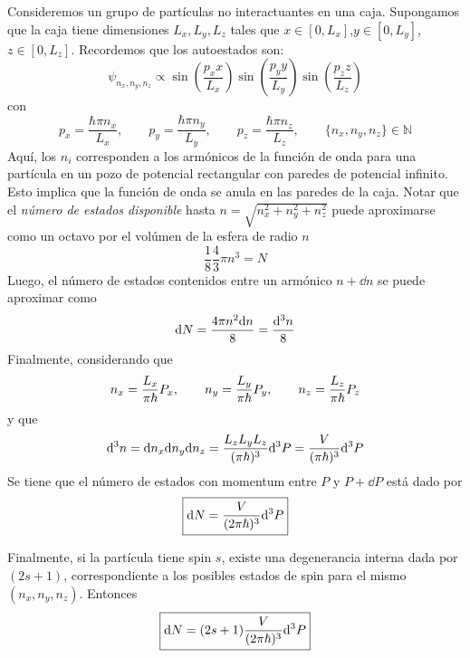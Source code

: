 Consideremos un grupo de partículas no interactuantes en una caja. Supongamos que la caja tiene dimensiones $L_x,L_y,L_z$ tales que $x\in [0,L_x]$,$y\in [0,L_y]$, $z\in [0,L_z]$. Recordemos que los autoestados son:
\begin{equation}
  \psi_{n_x,n_y,n_z}\propto \sin\left(\frac{p_xx}{L_x}\right)\sin\left(\frac{p_yy}{L_y}\right)\sin\left(\frac{p_zz}{L_z}\right)
\end{equation}
con
\begin{equation}
  p_x=\frac{\hbar \pi n_x}{L_x},\qquad p_y=\frac{\hbar \pi n_y}{L_y},\qquad p_z=\frac{\hbar \pi n_z}{L_z},\qquad \{n_x,n_y,n_z\}\in \mathbb{N}
\end{equation}
Aquí, los $n_i$ corresponden a los armónicos de la función de onda para una partícula en un pozo de potencial rectangular con paredes de potencial infinito. Esto implica que la función de onda se anula en las paredes de la caja. Notar que el \textit{número de estados disponible} hasta $n=\sqrt{n_x^2+n_y^2+n_z^2}$ puede aproximarse como un octavo por el volúmen de la esfera de radio $n$
\begin{equation}
  \frac{1}{8}\frac{4}{3}\pi n^3=N
\end{equation}
Luego, el número de estados contenidos entre un armónico $n+\dd n$ se puede aproximar como
\begin{equation}
  \dd N=\frac{4\pi n^2\dd n}{8}=\frac{\dd^3n}{8}
\end{equation}
Finalmente, considerando que
\begin{equation}
  n_x=\frac{L_x}{\pi\hbar}P_x,\qquad n_y=\frac{L_y}{\pi\hbar}P_y,\qquad n_z=\frac{L_z}{\pi\hbar}P_z
\end{equation}
y que
\begin{equation}
  \dd^3n=\dd n_x\dd n_y\dd n_z=\frac{L_zL_yL_z}{(\pi\hbar)^3}\dd^3P=\frac{V}{(\pi\hbar)^3}\dd^3P
\end{equation}
Se tiene que el número de estados con momentum entre $P$ y $P+\dd P$ está dado por
\begin{equation}
\boxed{  \dd N=\frac{V}{(2\pi\hbar)^3}\dd^3P}
\end{equation}

Finalmente, si la partícula tiene spin $s$, existe una degenerancia interna dada por $(2s+1)$, correspondiente a los posibles estados de spin para el mismo $(n_x,n_y,n_z)$. Entonces
\begin{equation}
\boxed{  \dd N=(2s+1)\frac{V}{(2\pi\hbar)^3}\dd^3P}
\end{equation}

